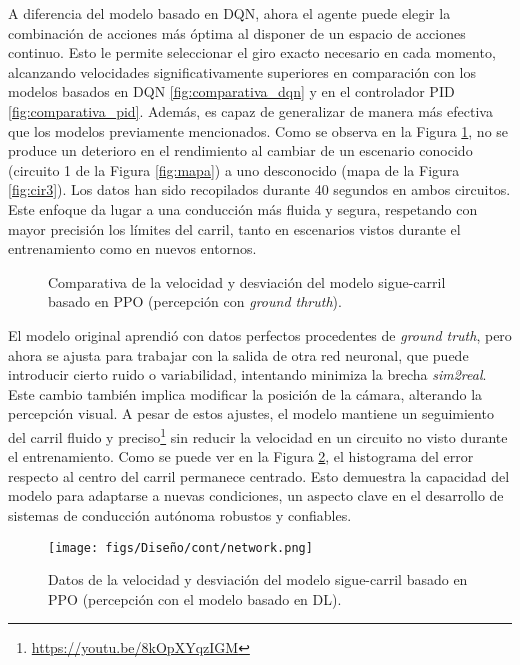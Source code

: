 A diferencia del modelo basado en \ac{DQN}, ahora el agente puede elegir la combinación de acciones más óptima al disponer de un espacio de acciones continuo. Esto le permite seleccionar el giro exacto necesario en cada momento, alcanzando velocidades significativamente superiores en comparación con los modelos basados en \ac{DQN} \ref{fig:comparativa_dqn} y en el controlador \ac{PID} \ref{fig:comparativa_pid}. Además, es capaz de generalizar de manera más efectiva que los modelos previamente mencionados. Como se observa en la Figura \ref{fig:comparativa_ppo}, no se produce un deterioro en el rendimiento al cambiar de un escenario conocido (circuito 1 de la Figura \ref{fig:mapa}) a uno desconocido (mapa de la Figura \ref{fig:cir3}). Los datos han sido recopilados durante 40 segundos en ambos circuitos. Este enfoque da lugar a una conducción más fluida y segura, respetando con mayor precisión los límites del carril, tanto en escenarios vistos durante el entrenamiento como en nuevos entornos.

\begin{figure}[ht]
\centering
{}
\hfill
{}
\caption{Comparativa de la velocidad y desviación del modelo sigue-carril basado en \ac{PPO} (percepción con \textit{ground thruth}).}
\label{fig:comparativa_ppo}
\end{figure}

\newpage

El modelo original aprendió con datos perfectos procedentes de \textit{ground truth}, pero ahora se ajusta para trabajar con la salida de otra red neuronal, que puede introducir cierto ruido o variabilidad, intentando minimiza la brecha \textit{sim2real}. Este cambio también implica modificar la posición de la cámara, alterando la percepción visual. A pesar de estos ajustes, el modelo mantiene un seguimiento del carril fluido y preciso\footnote{\url{https://youtu.be/8kOpXYqzIGM}} sin reducir la velocidad en un circuito no visto durante el entrenamiento. Como se puede ver en la Figura \ref{fig:network_ppo_carril}, el histograma del error respecto al centro del carril permanece centrado. Esto demuestra la capacidad del modelo para adaptarse a nuevas condiciones, un aspecto clave en el desarrollo de sistemas de conducción autónoma robustos y confiables. 
\begin{figure}[ht]
\centering
\texttt{[image: figs/Diseño/cont/network.png]}
\caption{Datos de la velocidad y desviación del modelo sigue-carril basado en \ac{PPO} (percepción con el modelo basado en \ac{DL}). }
\label{fig:network_ppo_carril}
\end{figure}

